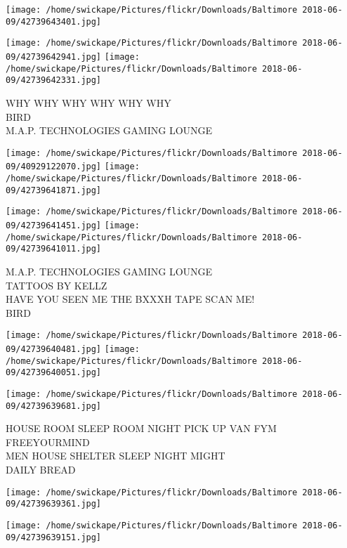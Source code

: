 \documentclass[10pt,letterpaper]{article}
\begin{document}
\texttt{[image: /home/swickape/Pictures/flickr/Downloads/Baltimore 2018-06-09/42739643401.jpg]}

\vspace{0.25in}
\texttt{[image: /home/swickape/Pictures/flickr/Downloads/Baltimore 2018-06-09/42739642941.jpg]}
\texttt{[image: /home/swickape/Pictures/flickr/Downloads/Baltimore 2018-06-09/42739642331.jpg]}

WHY WHY WHY WHY WHY WHY\\
BIRD\\
M.A.P. TECHNOLOGIES GAMING LOUNGE\\
\pagebreak

\texttt{[image: /home/swickape/Pictures/flickr/Downloads/Baltimore 2018-06-09/40929122070.jpg]}
\texttt{[image: /home/swickape/Pictures/flickr/Downloads/Baltimore 2018-06-09/42739641871.jpg]}

\texttt{[image: /home/swickape/Pictures/flickr/Downloads/Baltimore 2018-06-09/42739641451.jpg]}
\texttt{[image: /home/swickape/Pictures/flickr/Downloads/Baltimore 2018-06-09/42739641011.jpg]}

M.A.P. TECHNOLOGIES GAMING LOUNGE\\
TATTOOS BY KELLZ\\
HAVE YOU SEEN ME THE BXXXH TAPE SCAN ME!\\
BIRD\\
\pagebreak

\texttt{[image: /home/swickape/Pictures/flickr/Downloads/Baltimore 2018-06-09/42739640481.jpg]}
\texttt{[image: /home/swickape/Pictures/flickr/Downloads/Baltimore 2018-06-09/42739640051.jpg]}

\texttt{[image: /home/swickape/Pictures/flickr/Downloads/Baltimore 2018-06-09/42739639681.jpg]}

HOUSE ROOM SLEEP ROOM NIGHT PICK UP VAN FYM FREEYOURMIND\\
MEN HOUSE SHELTER SLEEP NIGHT MIGHT\\
DAILY BREAD\\
\pagebreak

\texttt{[image: /home/swickape/Pictures/flickr/Downloads/Baltimore 2018-06-09/42739639361.jpg]}

\vspace{0.25in}
\texttt{[image: /home/swickape/Pictures/flickr/Downloads/Baltimore 2018-06-09/42739639151.jpg]}
\end{document}
